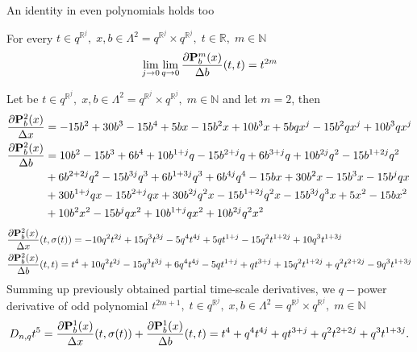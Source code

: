 An identity in even polynomials holds too
\begin{cor}
    For every $t\in q^{\mathbb{R}^j}, \; x,b\in\Lambda^2 = q^{\mathbb{R}^j} \times q^{\mathbb{R}^j}, \; t\in\mathbb{R}, \; m\in\mathbb{N}$
    \[
        \lim \limits_{j \to 0} \lim \limits_{q \to 0} \frac{\partial {\mathbf{P}}\sp{m} \sb{b}(x)}{\Delta b}(t,t) = t^{2m}
    \]
\end{cor}

\begin{examp}
    Let be $t\in q^{\mathbb{R}^j}, \; x,b\in\Lambda^2 = q^{\mathbb{R}^j} \times q^{\mathbb{R}^j}, \; m\in\mathbb{N}$ and let $m=2$, then
    \begin{align*}
        \frac{\partial {\mathbf{P}}\sp{2} \sb{b}(x)}{\Delta x}
        &= -15 b^2 + 30 b^3 - 15 b^4 + 5 b x - 15 b^2 x + 10 b^3 x + 5 b q x^j - 15 b^2 q x^j + 10 b^3 q x^j \\
        \frac{\partial {\mathbf{P}}\sp{2} \sb{b}(x)}{\Delta b}
        &= 10 b^2 - 15 b^3 + 6 b^4 + 10 b^{1 + j} q - 15 b^{2 + j} q + 6 b^{3 + j} q + 10 b^{2 j} q^2 - 15 b^{1 + 2 j} q^2 \\
        &+ 6 b^{2 + 2 j} q^2 - 15 b^{3 j} q^3 + 6 b^{1 + 3 j} q^3 + 6 b^{4 j} q^4 - 15 b x + 30 b^2 x - 15 b^3 x - 15 b^j q x \\
        &+ 30 b^{1 + j} q x - 15 b^{2 + j} q x + 30 b^{2 j} q^2 x - 15 b^{1 + 2 j} q^2 x - 15 b^{3 j} q^3 x + 5 x^2 - 15 b x^2 \\
        &+ 10 b^2 x^2 - 15 b^j q x^2 + 10 b^{1 + j} q x^2 + 10 b^{2 j} q^2 x^2
    \end{align*}
    \begin{align*}
        &\frac{\partial {\mathbf{P}}\sp{2} \sb{b}(x)}{\Delta x}(t, \sigma(t))
        = -10 q^2 t^{2 j} + 15 q^3 t^{3 j} - 5 q^4 t^{4 j} + 5 q t^{1 + j} - 15 q^2 t^{1 + 2 j} + 10 q^3 t^{1 + 3 j} \\
        &\frac{\partial {\mathbf{P}}\sp{2} \sb{b}(x)}{\Delta b}(t, t)
        = t^4 + 10 q^2 t^{2 j} - 15 q^3 t^{3 j} + 6 q^4 t^{4 j} - 5 q t^{1 + j} + q t^{3 + j} + 15 q^2 t^{1 + 2 j}
        + q^2 t^{2 + 2 j} - 9 q^3 t^{1 + 3 j}
    \end{align*}
    Summing up previously obtained partial time-scale derivatives, we $q-$power derivative of odd polynomial
    $t^{2m+1}, \; t\in q^{\mathbb{R}^j}, \; x,b\in\Lambda^2 = q^{\mathbb{R}^j} \times q^{\mathbb{R}^j}, \; m\in\mathbb{N}$
    \[
        D_{n,q} t^{5}
        = \frac{\partial {\mathbf{P}}\sp{1} \sb{b}(x)}{\Delta x}(t, \sigma(t)) + \frac{\partial {\mathbf{P}}\sp{1} \sb{b}(x)}{\Delta b}(t, t)
        = t^4 + q^4 t^{4 j} + q t^{3 + j} + q^2 t^{2 + 2 j} + q^3 t^{1 + 3 j}.
    \]
\end{examp}
